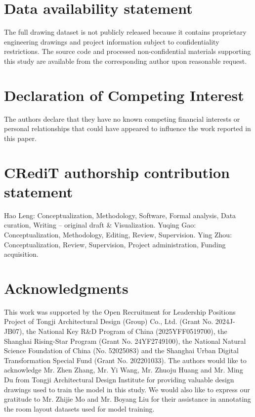 \documentclass[final,5p,times,twocolumn, fleqn]{elsarticle}
\begin{document}
\linenumbers







\section*{Data availability statement}
The full drawing dataset is not publicly released because it contains proprietary engineering drawings and project information subject to confidentiality restrictions. The source code and processed non-confidential materials supporting this study are available from the corresponding author upon reasonable request.

\section*{Declaration of Competing Interest}
The authors declare that they have no known competing financial interests or personal relationships that could have appeared to influence the work reported in this paper.

\section*{CRediT authorship contribution statement}
Hao Leng: Conceptualization, Methodology, Software, Formal analysis, Data curation, Writing – original draft \& Visualization. Yuqing Gao: Conceptualization, Methodology, Editing, Review, Supervision. Ying Zhou: Conceptualization, Review, Supervision, Project administration, Funding acquisition. 

\section*{Acknowledgments}
This work was supported by the Open Recruitment for Leadership Positions Project of Tongji Architectural Design (Group) Co., Ltd. (Grant No. 2024J-JB07), the National Key R\&D Program of China (2025YFF0519700), the Shanghai Rising-Star Program (Grant No. 24YF2749100), the National Natural Science Foundation of China (No. 52025083) and the Shanghai Urban Digital Transformation Special Fund (Grant No. 202201033). The authors would like to acknowledge Mr. Zhen Zhang, Mr. Yi Wang, Mr. Zhuoju Huang and Mr. Ming Du from Tongji Architectural Design Institute for providing valuable design drawings used to train the model in this study. We would also like to express our gratitude to Mr. Zhijie Mo and Mr. Boyang Liu for their assistance in annotating the room layout datasets used for model training.
\end{document}
